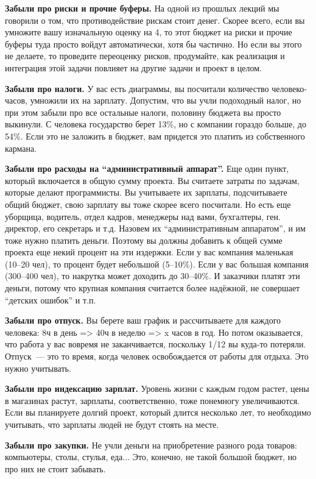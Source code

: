\documentclass{../../text-style}
\begin{document}
\textbf{Забыли про риски и прочие буферы.} На одной из прошлых лекций мы говорили о том, что противодействие рискам стоит денег. Скорее всего, если вы умножите вашу изначальную оценку на 4, то этот бюджет на риски и прочие буферы туда просто войдут автоматически, хотя бы частично. Но если вы этого не делаете, то проведите переоценку рисков, продумайте, как реализация и интеграция этой задачи повлияет на другие задачи и проект в целом.

\textbf{Забыли про налоги.} У вас есть диаграммы, вы посчитали количество человеко-часов, умножили их на зарплату. Допустим, что вы учли подоходный налог, но при этом забыли про все остальные налоги, половину бюджета вы просто выкинули. С человека государство берет 13\%, но с компании гораздо больше, до 54\%. Если это не заложить в бюджет, вам придется это платить из собственного кармана.

\textbf{Забыли про расходы на \enquote{административный аппарат}.} Еще один пункт, который включается в общую сумму проекта. Вы считаете затраты по задачам, которые делают программисты. Вы учитываете их зарплаты, подсчитываете общий бюджет, свою зарплату вы тоже скорее всего посчитали. Но есть еще уборщица, водитель, отдел кадров, менеджеры над вами, бухгалтеры, ген. директор, его секретарь и т.д. Назовем их \enquote{административным аппаратом}, и им тоже нужно платить деньги. Поэтому вы должны добавить к общей сумме проекта еще некий процент на эти издержки. Если у вас компания маленькая (10–20 чел), то процент будет небольшой (5–10\%). Если у вас большая компания (300–400 чел), то накрутка может доходить до 30–40\%. И заказчики платят эти деньги, потому что крупная компания считается более надёжной, не совершает \enquote{детских ошибок} и т.п.

\textbf{Забыли про отпуск.} Вы берете ваш график и рассчитываете для каждого человека: 8ч в день => 40ч в неделю => x часов в год. Но потом оказывается, что работа у вас вовремя не заканчивается, поскольку 1/12 вы куда-то потеряли. Отпуск~--- это то время, когда человек освобождается от работы для отдыха. Это нужно учитывать.

\textbf{Забыли про индексацию зарплат.} Уровень жизни с каждым годом растет, цены в магазинах растут, зарплаты, соответственно, тоже понемногу увеличиваются. Если вы планируете долгий проект, который длится несколько лет, то необходимо учитывать, что зарплаты людей не будут стоять на месте. 

\textbf{Забыли про закупки.} Не учли деньги на приобретение разного рода товаров: компьютеры, столы, стулья, еда... Это, конечно, не такой большой бюджет, но про них не стоит забывать.
\end{document}
